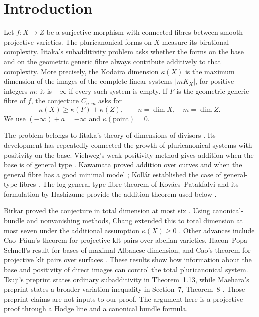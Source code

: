 \section{Introduction}\label{sec:introduction}\label{altord:section}

Let $f:X\to Z$ be a surjective morphism with connected fibres between
smooth projective varieties. The pluricanonical forms on $X$ measure
its birational complexity. Iitaka's subadditivity problem asks whether
the forms on the base and on the geometric generic fibre always
contribute additively to that complexity. More precisely, the Kodaira
dimension $\kappa(X)$ is the maximum dimension of the images of the
complete linear systems $|mK_X|$, for positive integers $m$; it is
$-\infty$ if every such system is empty. If $F$ is the geometric
generic fibre of $f$, the conjecture $C_{n,m}$ asks for
\[
                 \kappa(X)\geq\kappa(F)+\kappa(Z),
                 \qquad n=\dim X,\quad m=\dim Z.
\]
We use $(-\infty)+a=-\infty$ and $\kappa(\mathrm{point})=0$.

The problem belongs to Iitaka's theory of dimensions of divisors
\cite{IitakaOriginal}. Its development has repeatedly connected the
growth of pluricanonical systems with positivity on the base.
Viehweg's weak-positivity method gives addition when the base is of
general type \cite{ViehwegAdditivity}. Kawamata proved addition over
curves and when the general fibre has a good minimal model
\cite{KawamataCurves,KawamataKodaira}; Koll\'ar established the case
of general-type fibres \cite{Kollar87}. The log-general-type-fibre
theorem of Kov\'acs--Patakfalvi and its formulation by Hashizume
provide the addition theorem used below
\cite{KovacsPatakfalvi,Hashizume}.

Birkar proved the conjecture in total dimension at most six
\cite{BirkarIitakaSix}. Using canonical-bundle and nonvanishing
methods, Chang extended this to total dimension at most seven under
the additional assumption $\kappa(X)\geq0$
\cite[Theorem~1.8]{ChangNonvanishing}.
Other advances include Cao--P\u{a}un's theorem for projective klt pairs over abelian varieties,
Hacon--Popa--Schnell's result for bases of maximal Albanese dimension,
and Cao's theorem for projective klt pairs over surfaces
\cite{CaoPaunAbelian,HaconPopaSchnellAbelian,CaoSurfaces}.
These results show how information about the base and positivity of
direct images can control the total pluricanonical system.
Tsuji's preprint states ordinary
subadditivity in Theorem~1.13, while Maehara's preprint states a
broader variation inequality in Section~7, Theorem~8
\cite{TsujiDirectImages,MaeharaIitaka}. Those preprint claims are not
inputs to our proof. The argument here is a projective proof through
a Hodge line and a canonical bundle formula.

